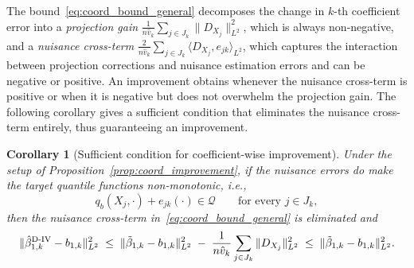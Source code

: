 \documentclass[12pt]{article}
\newcommand{\est}{\ensuremath{\textnormal{D-IV}}\xspace}
\newtheorem{corollary}{Corollary}
\begin{document}
The bound~\eqref{eq:coord_bound_general} decomposes the change in $k$-th coefficient error into a \emph{projection gain} $\frac{1}{n\hat v_k}\sum_{j\in J_k}\|D_{X_j}\|^2_{L^2}$, which is always non-negative, and a \emph{nuisance cross-term} $\frac{2}{n\hat v_k}\sum_{j\in J_k}\langle D_{X_j}, e_{jk}\rangle_{L^2}$, which captures the interaction between projection corrections and nuisance estimation errors and can be negative or positive. An improvement obtains whenever the nuisance cross-term is positive or when it is negative but does not overwhelm the projection gain. The following corollary gives a sufficient condition that eliminates the nuisance cross-term entirely, thus guaranteeing an improvement.

\begin{corollary}[Sufficient condition for coefficient-wise improvement]
\label{cor:coord_sufficient}
Under the setup of Proposition~\ref{prop:coord_improvement}, if the nuisance errors do make the target quantile functions non-monotonic, i.e.,
\begin{equation}\label{eq:Ak_feas}
q_b(X_j,\cdot)+e_{jk}(\cdot)\in\mathcal Q
\qquad\text{for every }j\in J_k,
\end{equation}
then the nuisance cross-term in~\eqref{eq:coord_bound_general} is eliminated and
\begin{equation}\label{eq:coord_bound_clean}
\|\hat\beta_{1,k}^{\est}-b_{1,k}\|_{L^2}^2
\;\le\;
\|\tilde\beta_{1,k}-b_{1,k}\|_{L^2}^2
\;-\;\frac{1}{n\hat v_k}\sum_{j\in J_k}\|D_{X_j}\|_{L^2}^2
\;\le\;
\|\tilde\beta_{1,k}-b_{1,k}\|_{L^2}^2.
\end{equation}
\end{corollary}
\end{document}
